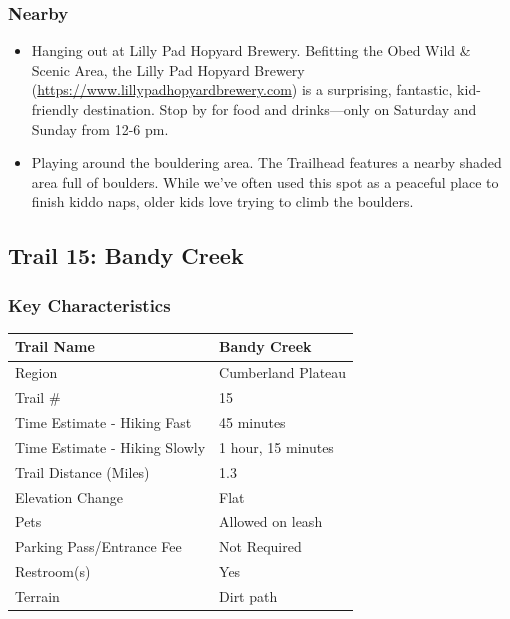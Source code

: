 \documentclass[
  letterpaper,
  DIV=11,
  numbers=noendperiod]{scrartcl}
\providecommand{\tightlist}{%
  \setlength{\itemsep}{0pt}\setlength{\parskip}{0pt}}\usepackage{longtable,booktabs,array}
\begin{document}
\hypertarget{nearby-13}{%
\subsubsection{Nearby}\label{nearby-13}}

\begin{itemize}
\tightlist
\item
  Hanging out at Lilly Pad Hopyard Brewery. Befitting the Obed Wild \&
  Scenic Area, the Lilly Pad Hopyard Brewery
  (\url{https://www.lillypadhopyardbrewery.com}) is a surprising,
  fantastic, kid-friendly destination. Stop by for food and
  drinks---only on Saturday and Sunday from 12-6 pm.
\item
  Playing around the bouldering area. The Trailhead features a nearby
  shaded area full of boulders. While we've often used this spot as a
  peaceful place to finish kiddo naps, older kids love trying to climb
  the boulders.
\end{itemize}

\hypertarget{trail-15-bandy-creek}{%
\subsection{Trail 15: Bandy Creek}\label{trail-15-bandy-creek}}

\hypertarget{key-characteristics-14}{%
\subsubsection{Key Characteristics}\label{key-characteristics-14}}

\begin{longtable}[]{@{}ll@{}}
\toprule\noalign{}
Trail Name & Bandy Creek \\
\midrule\noalign{}
\endhead
\bottomrule\noalign{}
\endlastfoot
Region & Cumberland Plateau \\
Trail \# & 15 \\
Time Estimate - Hiking Fast & 45 minutes \\
Time Estimate - Hiking Slowly & 1 hour, 15 minutes \\
Trail Distance (Miles) & 1.3 \\
Elevation Change & Flat \\
Pets & Allowed on leash \\
Parking Pass/Entrance Fee & Not Required \\
Restroom(s) & Yes \\
Terrain & Dirt path \\
\end{longtable}
\end{document}
